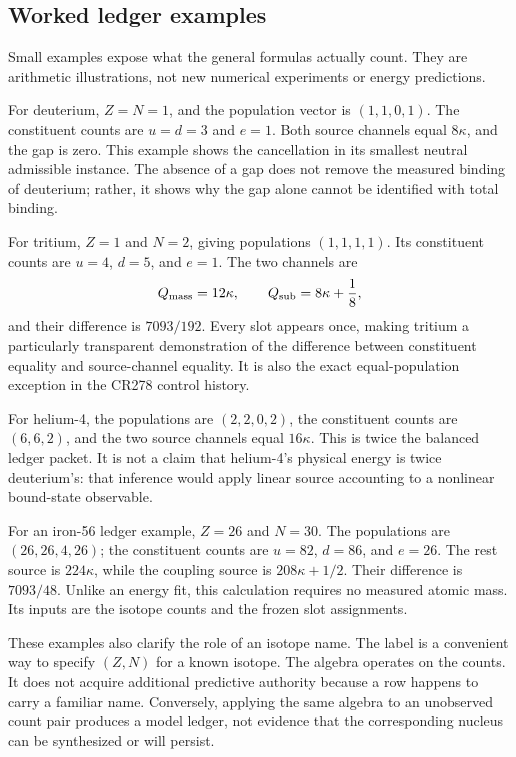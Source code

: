 \subsection{Worked ledger examples}
\label{v2c4:examples}

Small examples expose what the general formulas actually count. They are arithmetic illustrations, not new numerical experiments or energy predictions.

For deuterium, $Z=N=1$, and the population vector is $(1,1,0,1)$. The constituent counts are $u=d=3$ and $e=1$. Both source channels equal $8\kappa$, and the gap is zero. This example shows the cancellation in its smallest neutral admissible instance. The absence of a gap does not remove the measured binding of deuterium; rather, it shows why the gap alone cannot be identified with total binding.

For tritium, $Z=1$ and $N=2$, giving populations $(1,1,1,1)$. Its constituent counts are $u=4$, $d=5$, and $e=1$. The two channels are
\begin{equation}
 Q_{\rm mass}=12\kappa,\qquad
 Q_{\rm sub}=8\kappa+\frac18,
\end{equation}
and their difference is $7093/192$. Every slot appears once, making tritium a particularly transparent demonstration of the difference between constituent equality and source-channel equality. It is also the exact equal-population exception in the CR278 control history.

For helium-4, the populations are $(2,2,0,2)$, the constituent counts are $(6,6,2)$, and the two source channels equal $16\kappa$. This is twice the balanced ledger packet. It is not a claim that helium-4's physical energy is twice deuterium's: that inference would apply linear source accounting to a nonlinear bound-state observable.

For an iron-56 ledger example, $Z=26$ and $N=30$. The populations are $(26,26,4,26)$; the constituent counts are $u=82$, $d=86$, and $e=26$. The rest source is $224\kappa$, while the coupling source is $208\kappa+1/2$. Their difference is $7093/48$. Unlike an energy fit, this calculation requires no measured atomic mass. Its inputs are the isotope counts and the frozen slot assignments.

These examples also clarify the role of an isotope name. The label is a convenient way to specify $(Z,N)$ for a known isotope. The algebra operates on the counts. It does not acquire additional predictive authority because a row happens to carry a familiar name. Conversely, applying the same algebra to an unobserved count pair produces a model ledger, not evidence that the corresponding nucleus can be synthesized or will persist.

